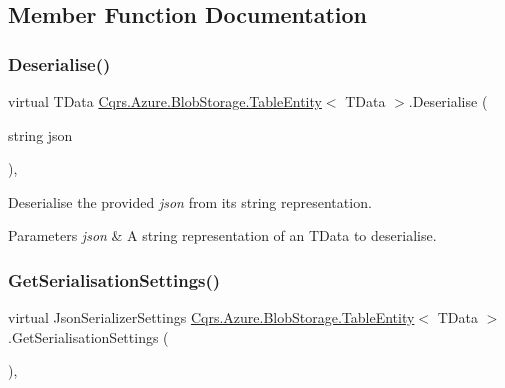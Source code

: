 \subsection{Member Function Documentation}
\mbox{\label{classCqrs_1_1Azure_1_1BlobStorage_1_1TableEntity_a5a5b53a3a2427a368f2ebe404f04f4ff_a5a5b53a3a2427a368f2ebe404f04f4ff}} 
\subsubsection{\texorpdfstring{Deserialise()}{Deserialise()}}
{\footnotesize\ttfamily virtual T\+Data \hyperlink{classCqrs_1_1Azure_1_1BlobStorage_1_1TableEntity}{Cqrs.\+Azure.\+Blob\+Storage.\+Table\+Entity}$<$ T\+Data $>$.Deserialise (\begin{DoxyParamCaption}\item[{string}]{json }\end{DoxyParamCaption})\hspace{0.3cm}{\ttfamily [protected]}, {\ttfamily [virtual]}}



Deserialise the provided {\itshape json}  from its string representation. 


\begin{DoxyParams}{Parameters}
{\em json} & A string representation of an T\+Data to deserialise.\\
\hline
\end{DoxyParams}
\mbox{\label{classCqrs_1_1Azure_1_1BlobStorage_1_1TableEntity_aa36736f412df5a1667d7b0e5c0bd3035_aa36736f412df5a1667d7b0e5c0bd3035}} 
\subsubsection{\texorpdfstring{Get\+Serialisation\+Settings()}{GetSerialisationSettings()}}
{\footnotesize\ttfamily virtual Json\+Serializer\+Settings \hyperlink{classCqrs_1_1Azure_1_1BlobStorage_1_1TableEntity}{Cqrs.\+Azure.\+Blob\+Storage.\+Table\+Entity}$<$ T\+Data $>$.Get\+Serialisation\+Settings (\begin{DoxyParamCaption}{ }\end{DoxyParamCaption})\hspace{0.3cm}{\ttfamily [protected]}, {\ttfamily [virtual]}}



